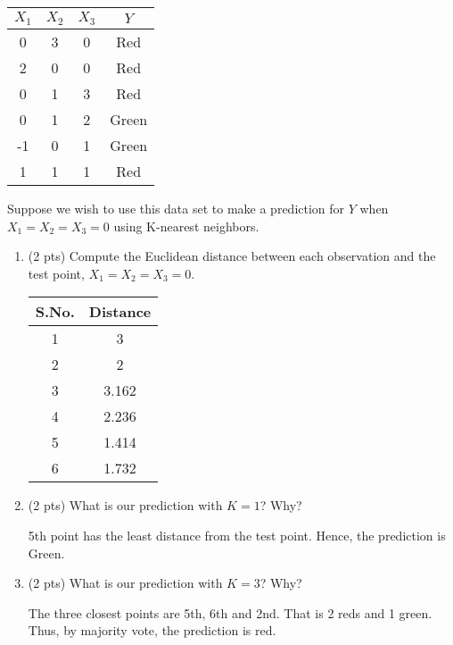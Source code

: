 \documentclass[a4paper]{article}
\theoremstyle{definition}
\newenvironment{soln}{
    \leavevmode\color{blue}\ignorespaces
}{}
\begin{document}
\begin{enumerate}
\begin{center}
	\begin{tabular}{ c  c  c  c}
		\hline
		$X_{1}$ & $X_{2}$ & $X_{3}$ & $Y$ \\ \hline
		0 & 3 & 0 & Red \\
		2 & 0 & 0 & Red \\
		0 & 1 & 3 & Red \\
		0 & 1 & 2 & Green \\
		-1 & 0 & 1 & Green \\
		1 & 1 & 1 & Red  \\
		\hline
	\end{tabular}
\end{center}

Suppose we wish to use this data set to make a prediction for $Y$ when $X_{1} = X_{2} = X_{3} = 0$ using K-nearest neighbors.

\begin{enumerate}
	\item (2 pts) Compute the Euclidean distance between each observation and the test point, $X_{1} = X_{2} = X_{3}=0$.
 
	\begin{soln}  
		\begin{center}
			\begin{tabular}{ c  c}
				\hline
				S.No. & Distance \\ \hline
				1 & 3 \\
				2 & 2 \\
				3 & 3.162 \\
				4 & 2.236 \\
				5 & 1.414 \\
				6 & 1.732 \\
				\hline
			\end{tabular}
		\end{center}
	\end{soln}
 
	\item (2 pts) What is our prediction with $K=1$? Why?
	
	\begin{soln}
	5th point has the least distance from the test point. Hence, the prediction is Green.
	\end{soln}
	
	\item (2 pts) What is our prediction with $K=3$? Why?
	
	\begin{soln}
	The three closest points are 5th, 6th and 2nd. That is 2 reds and 1 green. Thus, by majority vote, the prediction is red.
	\end{soln}


\end{enumerate}
\end{enumerate}
\end{document}
